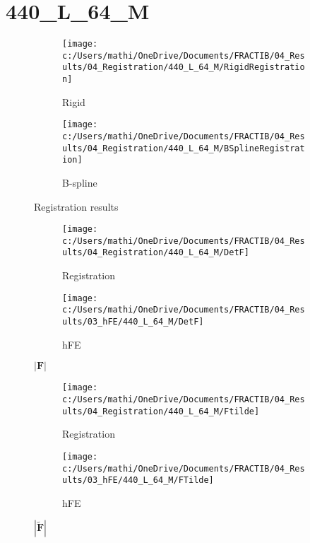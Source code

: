 \documentclass{article}%
\begin{document}
%
\newpage%
\section*{440\_L\_64\_M}%
\label{sec:440L64M}%


\begin{figure}[h!]%
\begin{subfigure}[b]{0.5\linewidth}%
\texttt{[image: c:/Users/mathi/OneDrive/Documents/FRACTIB/04\_Results/04\_Registration/440\_L\_64\_M/RigidRegistration]}%
\caption{Rigid}%
\end{subfigure}%
\begin{subfigure}[b]{0.5\linewidth}%
\texttt{[image: c:/Users/mathi/OneDrive/Documents/FRACTIB/04\_Results/04\_Registration/440\_L\_64\_M/BSplineRegistration]}%
\caption{B{-}spline}%
\end{subfigure}%
\caption{Registration results}%
\end{figure}

%


\begin{figure}[h!]%
\begin{subfigure}[b]{0.5\linewidth}%
\texttt{[image: c:/Users/mathi/OneDrive/Documents/FRACTIB/04\_Results/04\_Registration/440\_L\_64\_M/DetF]}%
\caption{Registration}%
\end{subfigure}%
\begin{subfigure}[b]{0.5\linewidth}%
\texttt{[image: c:/Users/mathi/OneDrive/Documents/FRACTIB/04\_Results/03\_hFE/440\_L\_64\_M/DetF]}%
\caption{hFE}%
\end{subfigure}%
\caption{$|\mathbf{F}|$}%
\end{figure}

%


\begin{figure}[h!]%
\begin{subfigure}[b]{0.5\linewidth}%
\texttt{[image: c:/Users/mathi/OneDrive/Documents/FRACTIB/04\_Results/04\_Registration/440\_L\_64\_M/Ftilde]}%
\caption{Registration}%
\end{subfigure}%
\begin{subfigure}[b]{0.5\linewidth}%
\texttt{[image: c:/Users/mathi/OneDrive/Documents/FRACTIB/04\_Results/03\_hFE/440\_L\_64\_M/FTilde]}%
\caption{hFE}%
\end{subfigure}%
\caption{$|\widetilde{\mathbf{F}}|$}%
\end{figure}

%
\newpage%
\end{document}
